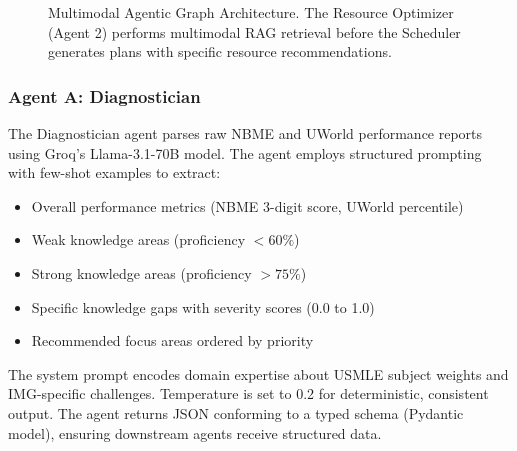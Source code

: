 \begin{figure}[H]
\centering
{}
\caption{Multimodal Agentic Graph Architecture. The Resource Optimizer (Agent 2) performs multimodal RAG retrieval before the Scheduler generates plans with specific resource recommendations.}
\label{fig:graph_architecture}
\end{figure}

\subsubsection{Agent A: Diagnostician}

The Diagnostician agent parses raw NBME and UWorld performance reports using Groq's Llama-3.1-70B model. The agent employs structured prompting with few-shot examples to extract:

\begin{itemize}
    \item Overall performance metrics (NBME 3-digit score, UWorld percentile)
    \item Weak knowledge areas (proficiency $< 60\%$)
    \item Strong knowledge areas (proficiency $> 75\%$)
    \item Specific knowledge gaps with severity scores (0.0 to 1.0)
    \item Recommended focus areas ordered by priority
\end{itemize}

The system prompt encodes domain expertise about USMLE subject weights and IMG-specific challenges. Temperature is set to 0.2 for deterministic, consistent output. The agent returns JSON conforming to a typed schema (Pydantic model), ensuring downstream agents receive structured data.

